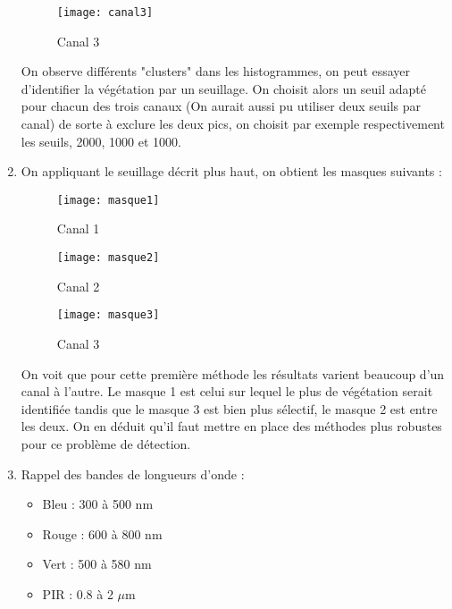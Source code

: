 \documentclass[12pt,a4paper,titlepage]{article}
\begin{document}
\begin{enumerate}
{            \begin{figure}[H]
                \caption{Canal 3}
                \texttt{[image: canal3]}
                \centering
            \end{figure}

            On observe différents "clusters" dans les histogrammes, on peut essayer d'identifier
            la végétation par un seuillage. On choisit alors un seuil adapté pour chacun des
            trois canaux (On aurait aussi pu utiliser deux seuils par canal) de sorte à
            exclure les deux pics, on choisit par exemple respectivement les seuils, 2000, 1000
            et 1000.
        }

    \item{
            On appliquant le seuillage décrit plus haut, on obtient les masques suivants :

            \begin{figure}[H]
                \caption{Canal 1}
                \texttt{[image: masque1]}
                \centering
            \end{figure}

            \begin{figure}[H]
                \caption{Canal 2}
                \texttt{[image: masque2]}
                \centering
            \end{figure}

            \begin{figure}[H]
                \caption{Canal 3}
                \texttt{[image: masque3]}
                \centering
            \end{figure}

            On voit que pour cette première méthode les résultats varient beaucoup d'un
            canal à l'autre. Le masque 1 est celui sur lequel le plus de végétation serait
            identifiée tandis que le masque 3 est bien plus sélectif, le masque 2 est entre
            les deux. On en déduit qu'il faut mettre en place des méthodes plus robustes
            pour ce problème de détection.
        }

    \item{
            Rappel des bandes de longueurs d'onde :

            \begin{itemize}
                \item{Bleu : 300 à 500 nm}
                \item{Rouge : 600 à 800 nm}
                \item{Vert : 500 à 580 nm}
                \item{PIR : 0.8 à 2 $\mu$m}
            \end{itemize}

}
\end{enumerate}
\end{document}

